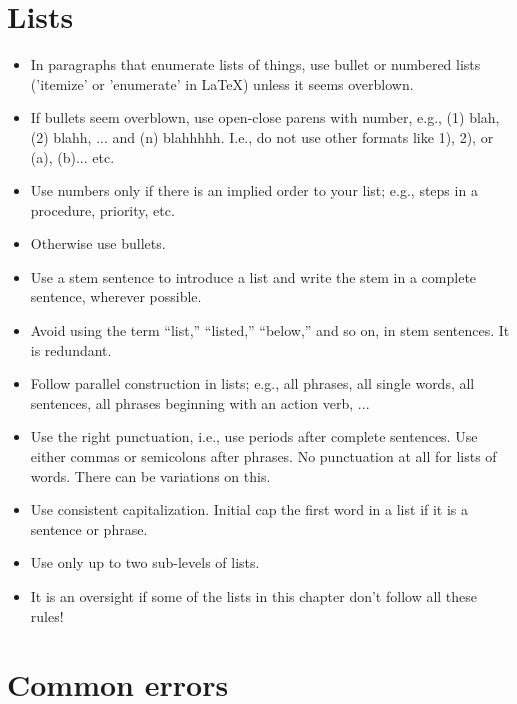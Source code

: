 \section{Lists}
\label{sec:english-lists}

\begin{itemize}
\item In paragraphs that enumerate lists of things, use bullet or numbered lists ('itemize' or 'enumerate' in LaTeX) unless it seems overblown.
\item If bullets seem overblown,  use open-close parens with number, e.g., (1) blah, (2) blahh, ... and (n) blahhhhh. I.e., do not use other formats like 1), 2), or (a), (b)... etc.
\item Use numbers only if there is an implied order to your list; e.g., steps in a procedure, priority, etc.
\item Otherwise use bullets.
\item Use a stem sentence to introduce a list and write the stem in a complete sentence, wherever possible.
\item Avoid using the term ``list,'' ``listed,'' ``below,'' and so on, in stem sentences. It is redundant. 
\item Follow parallel construction in lists; e.g., all phrases, all single words, all sentences, all phrases beginning with an action verb, ...
\item Use the right punctuation, i.e., use periods after complete sentences. Use either commas or semicolons after phrases. No punctuation at all for lists of words. There can be variations on this.
\item Use consistent capitalization. Initial cap the first word in a list if it is a sentence or phrase. 
\item Use only up to two sub-levels of lists.
\item It is an oversight if some of the lists in this chapter don't follow all these rules!
\end{itemize}

\section{Common errors}
\label{sec:english-errors}

